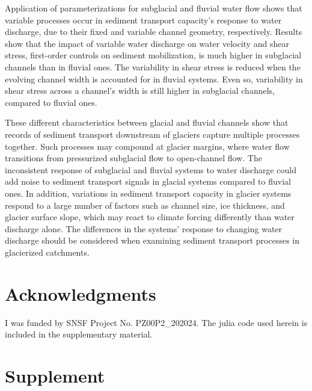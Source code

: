 \documentclass[11pt]{article}
\begin{document}
\begin{spacing}{1}
  Application of parameterizations for subglacial and fluvial water flow shows that variable processes occur in sediment transport capacity's response to water discharge, due to their fixed and variable channel geometry, respectively.
  Results show that the impact of variable water discharge on water velocity and shear stress, first-order controls on sediment mobilization, is much higher in subglacial channels than in fluvial ones.
  The variability in shear stress is reduced when the evolving channel width is accounted for in fluvial systems.
  Even so, variability in shear stress across a channel's width is still higher in subglacial channels, compared to fluvial ones.
  
  These different characteristics between glacial and fluvial channels show that records of sediment transport downstream of glaciers capture multiple processes together.
  Such processes may compound at glacier margins, where water flow transitions from pressurized subglacial flow to open-channel flow.
  The inconsistent response of subglacial and fluvial systems to water discharge could add  noise to sediment transport signals in glacial systems compared to fluvial ones.
  In addition, variations in sediment transport capacity in glacier systems respond to a large number of factors such as channel size, ice thickness, and glacier surface slope, which may react to climate forcing differently than water discharge alone. 
  The differences in the systems' response to changing water discharge should be considered when examining sediment transport processes in glacierized catchments.
  
  \section{Acknowledgments}
  
  I was funded by SNSF Project No. PZ00P2\_202024.
  The julia code used herein is included in the supplementary material.
  
  
\end{spacing}





\section{Supplement}
\end{document}
